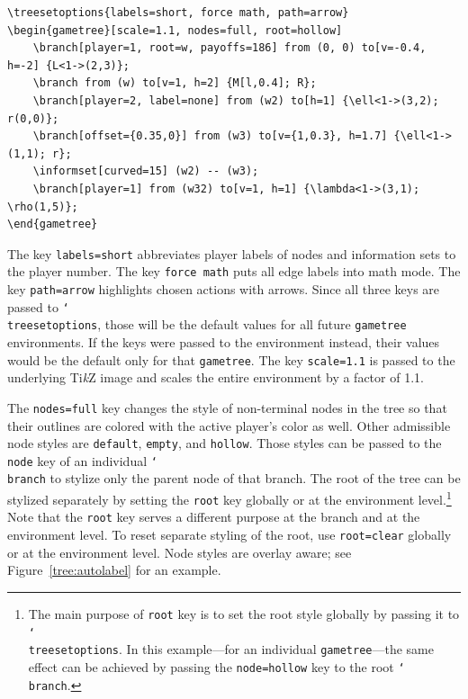 \documentclass{article}
\renewcommand{\textbackslash}{\char`\\}
\def\cmd#1{\texttt{\color{cmd}\textbackslash#1}}
\def\TikZ{Ti\emph{k}Z\xspace}
\begin{document}
\begin{verbatim}
\treesetoptions{labels=short, force math, path=arrow}
\begin{gametree}[scale=1.1, nodes=full, root=hollow]
	\branch[player=1, root=w, payoffs=186] from (0, 0) to[v=-0.4, h=-2] {L<1->(2,3)};
	\branch from (w) to[v=1, h=2] {M[l,0.4]; R};
	\branch[player=2, label=none] from (w2) to[h=1] {\ell<1->(3,2); r(0,0)};
	\branch[offset={0.35,0}] from (w3) to[v={1,0.3}, h=1.7] {\ell<1->(1,1); r};
	\informset[curved=15] (w2) -- (w3);
	\branch[player=1] from (w32) to[v=1, h=1] {\lambda<1->(3,1); \rho(1,5)};
\end{gametree}
\end{verbatim}
\vspace{-1mm}

The key \texttt{labels=short} abbreviates player labels of nodes and information sets to the player number. The key \texttt{force math} puts all edge labels into math mode. The key \texttt{path=arrow} highlights chosen actions with arrows. Since all three keys are passed to \cmd{treesetoptions}, those will be the default values for all future \texttt{gametree} environments. If the keys were passed to the environment instead, their values would be the default only for that \texttt{gametree}. The key \texttt{scale=1.1} is passed to the underlying \TikZ image and scales the entire environment by a factor of 1.1. 

The \texttt{nodes=full} key changes the style of non-terminal nodes in the tree so that their outlines are colored with the active player's color as well. Other admissible node styles are \texttt{default}, \texttt{empty}, and \texttt{hollow}. Those styles can be passed to the \texttt{node} key of an individual \cmd{branch} to stylize only the parent node of that branch. The root of the tree can be stylized separately by setting the \texttt{root} key globally or at the environment level.\footnote{The main purpose of \texttt{root} key is to set the root style globally by passing it to \cmd{treesetoptions}. In this example---for an individual \texttt{gametree}---the same effect can be achieved by passing the \texttt{node=hollow} key to the root \cmd{branch}.} Note that the \texttt{root} key serves a different purpose at the branch and at the environment level. To reset separate styling of the root, use \texttt{root=clear} globally or at the environment level. 
%
Node styles are overlay aware; see Figure~\ref{tree:autolabel} for an example. 
\end{document}
